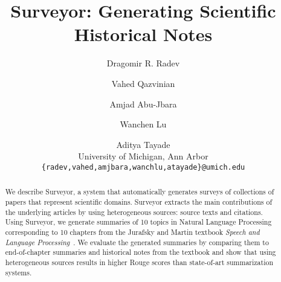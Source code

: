 \documentclass[11pt]{article}
\title{Surveyor: Generating Scientific Historical Notes}
\author{Dragomir R. Radev \and  Vahed Qazvinian \and Amjad Abu-Jbara \and  Wanchen Lu \and  Aditya Tayade\\
  University of Michigan, Ann Arbor\\
  {\tt \{radev,vahed,amjbara,wanchlu,atayade\}@umich.edu} \\
}
\date{}
\begin{document}
\maketitle

\begin{abstract}
We describe Surveyor, a system that automatically generates surveys of
collections of papers that represent scientific domains. Surveyor
extracts the main contributions of the underlying articles by
using heterogeneous sources: source texts and citations.  Using
Surveyor, we generate summaries of 10 topics in Natural Language
Processing corresponding to 10 chapters from the Jurafsky and Martin
textbook \emph{Speech and Language Processing}~\cite{JurafskyM08}. We evaluate the generated
summaries by comparing them to end-of-chapter summaries and
historical notes from the textbook and show that using heterogeneous
sources results in higher Rouge scores than state-of-art
summarization systems.
\end{abstract}














\end{document}
